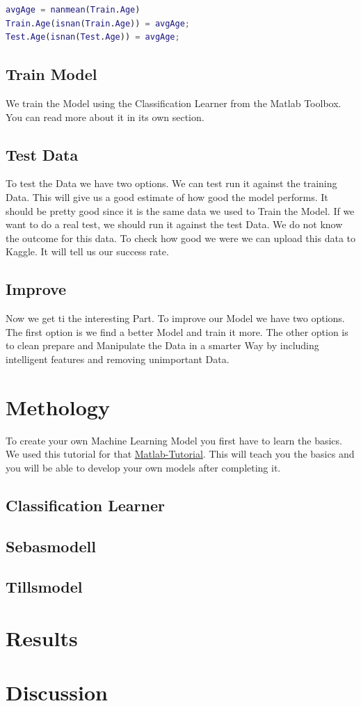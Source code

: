 \documentclass[
   10.5pt,
   invert-title=true,
   titlepage=false,
   titleimage-ratio=13,
   class=article
]{bfhpub}				%
\begin{document}
\begin{lstlisting}[language=Matlab]
avgAge = nanmean(Train.Age)          
Train.Age(isnan(Train.Age)) = avgAge;  
Test.Age(isnan(Test.Age)) = avgAge;    
\end{lstlisting}

\subsection*{Train Model}
We train the Model using the Classification Learner from the Matlab Toolbox. You can read more about it in its own section. 
 
\subsection*{Test Data}
To test the Data we have two options. We can test run it against the training Data. This will give us a good estimate of how good the model performs. It should be pretty good since it is the same data we used to Train the Model. If we want to do a real test, we should run it against the test Data. We do not know the outcome for this data. To check how good we were we can upload this data to Kaggle. It will tell us our success rate. 

\subsection*{Improve}
Now we get ti the interesting Part. To improve our Model we have two options. The first option is we find a better Model and train it more. The other option is to clean prepare and Manipulate the Data in a smarter Way by including intelligent features and removing unimportant Data.


\section*{Methology}
To create your own Machine Learning Model you first have to learn the basics. We used this tutorial for that \href{https://blogs.mathworks.com/loren/2015/06/18/getting-started-with-kaggle-data-science-competitions/}{Matlab-Tutorial}.
This will teach you the basics and you will be able to develop your own models after completing it.

\subsection*{Classification Learner}

\subsection*{Sebasmodell}

\subsection*{Tillsmodel}

\section*{Results}

\section*{Discussion}


\end{document}
